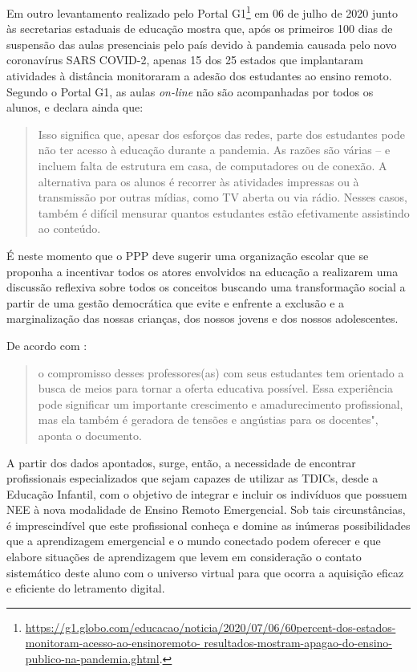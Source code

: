 \documentclass{textolivre}
\begin{document}
Em outro levantamento realizado pelo Portal G1\footnote{\url{https://g1.globo.com/educacao/noticia/2020/07/06/60percent-dos-estados-monitoram-acesso-ao-ensinoremoto-    resultados-mostram-apagao-do-ensino-publico-na-pandemia.ghtml}.} em 06 de julho de 2020 junto às secretarias estaduais de educação mostra que, após os primeiros 100 dias de suspensão das aulas presenciais pelo país devido à pandemia causada pelo novo coronavírus SARS COVID-2, apenas 15 dos 25 estados que implantaram atividades à distância monitoraram a adesão dos estudantes ao ensino remoto. Segundo o Portal G1, as aulas \textit{on-line} não são acompanhadas por todos os alunos, e declara ainda que:

\begin{quote}
    Isso significa que, apesar dos esforços das redes, parte dos estudantes pode não ter acesso à educação durante a pandemia. As razões são várias – e incluem falta de estrutura em casa, de computadores ou de conexão. A alternativa para os alunos é recorrer às atividades impressas ou à transmissão por outras mídias, como TV aberta ou via rádio. Nesses casos, também é difícil mensurar quantos estudantes estão efetivamente assistindo ao conteúdo.
\end{quote}

É neste momento que o PPP deve sugerir uma organização escolar que se proponha a incentivar todos os atores envolvidos na educação a realizarem uma discussão reflexiva sobre todos os conceitos buscando uma transformação social a partir de uma gestão democrática que evite e enfrente a exclusão e a marginalização das nossas crianças, dos nossos jovens e dos nossos adolescentes.

De acordo com \textcite[p. 21]{oliveira_trabalho_2020}:

\begin{quote}
    o compromisso desses professores(as) com seus estudantes tem orientado a busca de meios para tornar a oferta educativa possível. Essa experiência pode significar um importante crescimento e amadurecimento profissional, mas ela também é geradora de tensões e angústias para os docentes", aponta o documento.
\end{quote}

A partir dos dados apontados, surge, então, a necessidade de encontrar profissionais especializados que sejam capazes de utilizar as TDICs, desde a Educação Infantil, com o objetivo de integrar e incluir os indivíduos que possuem NEE à nova modalidade de Ensino Remoto Emergencial. Sob tais circunstâncias, é imprescindível que este profissional conheça e domine as inúmeras possibilidades que a aprendizagem emergencial e o mundo conectado podem oferecer e que elabore situações de aprendizagem que levem em consideração o contato sistemático deste aluno com o universo virtual para que ocorra a aquisição eficaz e eficiente do letramento digital. 
\end{document}
